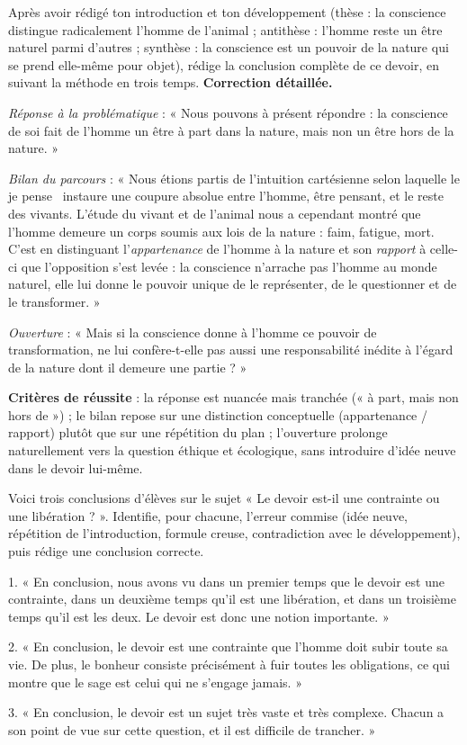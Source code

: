 \documentclass[11pt]{article}
\begin{document}
\begin{exoresolu}
Après avoir rédigé ton introduction et ton développement (thèse : la conscience distingue radicalement l'homme de l'animal ; antithèse : l'homme reste un être naturel parmi d'autres ; synthèse : la conscience est un pouvoir de la nature qui se prend elle-même pour objet), rédige la conclusion complète de ce devoir, en suivant la méthode en trois temps.
\tcblower
\textbf{Correction détaillée.}

\emph{Réponse à la problématique} : « Nous pouvons à présent répondre : la conscience de soi fait de l'homme un être à part dans la nature, mais non un être hors de la nature. »

\emph{Bilan du parcours} : « Nous étions partis de l'intuition cartésienne selon laquelle le \guillemotleft je pense \guillemotright\ instaure une coupure absolue entre l'homme, être pensant, et le reste des vivants. L'étude du vivant et de l'animal nous a cependant montré que l'homme demeure un corps soumis aux lois de la nature : faim, fatigue, mort. C'est en distinguant l'\emph{appartenance} de l'homme à la nature et son \emph{rapport} à celle-ci que l'opposition s'est levée : la conscience n'arrache pas l'homme au monde naturel, elle lui donne le pouvoir unique de le représenter, de le questionner et de le transformer. »

\emph{Ouverture} : « Mais si la conscience donne à l'homme ce pouvoir de transformation, ne lui confère-t-elle pas aussi une responsabilité inédite à l'égard de la nature dont il demeure une partie ? »

\medskip
\textbf{Critères de réussite} : la réponse est nuancée mais tranchée (« à part, mais non hors de ») ; le bilan repose sur une distinction conceptuelle (appartenance / rapport) plutôt que sur une répétition du plan ; l'ouverture prolonge naturellement vers la question éthique et écologique, sans introduire d'idée neuve dans le devoir lui-même.
\end{exoresolu}

\begin{exercice}
Voici trois conclusions d'élèves sur le sujet « Le devoir est-il une contrainte ou une libération ? ». Identifie, pour chacune, l'erreur commise (idée neuve, répétition de l'introduction, formule creuse, contradiction avec le développement), puis rédige une conclusion correcte.

1. « En conclusion, nous avons vu dans un premier temps que le devoir est une contrainte, dans un deuxième temps qu'il est une libération, et dans un troisième temps qu'il est les deux. Le devoir est donc une notion importante. »

2. « En conclusion, le devoir est une contrainte que l'homme doit subir toute sa vie. De plus, le bonheur consiste précisément à fuir toutes les obligations, ce qui montre que le sage est celui qui ne s'engage jamais. »

3. « En conclusion, le devoir est un sujet très vaste et très complexe. Chacun a son point de vue sur cette question, et il est difficile de trancher. »
\end{exercice}
\end{document}
